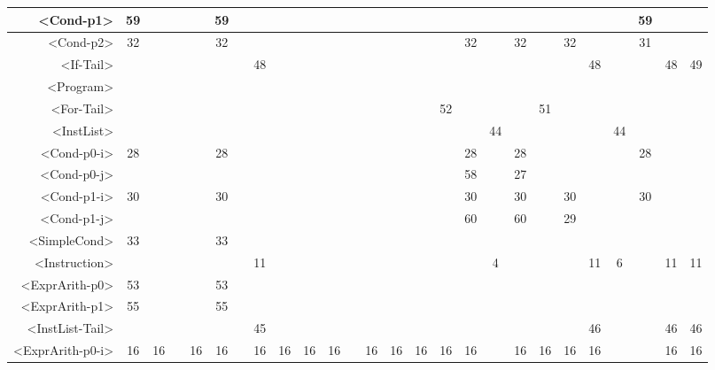 \begin{tabular}{r|c@{ }c@{ }c@{ }c@{ }c@{ }c@{ }c@{ }c@{ }c@{ }c@{ }c@{ }c@{ }c@{ }c@{ }c@{ }c@{ }c@{ }c@{ }c@{ }c@{ }c@{ }c@{ }c@{ }c@{ }c@{ }}
<Cond-p1> & 59 &   &   &   & 59 &   &   &   &   &   &   &   &   &   &   &   &   &   &   &   &   &   & 59 &   &   \\\hline
<Cond-p2> & 32 &   &   &   & 32 &   &   &   &   &   &   &   &   &   &   & 32 &   & 32 &   & 32 &   &   & 31 &   &   \\\hline
<If-Tail> &   &   &   &   &   &   & 48 &   &   &   &   &   &   &   &   &   &   &   &   &   & 48 &   &   & 48 & 49 \\\hline
<Program> &   &   &   &   &   &   &   &   &   &   &   &   &   &   &   &   &   &   &   &   &   &   &   &   &   \\\hline
<For-Tail> &   &   &   &   &   &   &   &   &   &   &   &   &   &   & 52 &   &   &   & 51 &   &   &   &   &   &   \\\hline
<InstList> &   &   &   &   &   &   &   &   &   &   &   &   &   &   &   &   & 44 &   &   &   &   & 44 &   &   &   \\\hline
<Cond-p0-i> & 28 &   &   &   & 28 &   &   &   &   &   &   &   &   &   &   & 28 &   & 28 &   &   &   &   & 28 &   &   \\\hline
<Cond-p0-j> &   &   &   &   &   &   &   &   &   &   &   &   &   &   &   & 58 &   & 27 &   &   &   &   &   &   &   \\\hline
<Cond-p1-i> & 30 &   &   &   & 30 &   &   &   &   &   &   &   &   &   &   & 30 &   & 30 &   & 30 &   &   & 30 &   &   \\\hline
<Cond-p1-j> &   &   &   &   &   &   &   &   &   &   &   &   &   &   &   & 60 &   & 60 &   & 29 &   &   &   &   &   \\\hline
<SimpleCond> & 33 &   &   &   & 33 &   &   &   &   &   &   &   &   &   &   &   &   &   &   &   &   &   &   &   &   \\\hline
<Instruction> &   &   &   &   &   &   & 11 &   &   &   &   &   &   &   &   &   & 4 &   &   &   & 11 & 6 &   & 11 & 11 \\\hline
<ExprArith-p0> & 53 &   &   &   & 53 &   &   &   &   &   &   &   &   &   &   &   &   &   &   &   &   &   &   &   &   \\\hline
<ExprArith-p1> & 55 &   &   &   & 55 &   &   &   &   &   &   &   &   &   &   &   &   &   &   &   &   &   &   &   &   \\\hline
<InstList-Tail> &   &   &   &   &   &   & 45 &   &   &   &   &   &   &   &   &   &   &   &   &   & 46 &   &   & 46 & 46 \\\hline
<ExprArith-p0-i> & 16 & 16 &   & 16 & 16 &   & 16 & 16 & 16 & 16 &   & 16 & 16 & 16 & 16 & 16 &   & 16 & 16 & 16 & 16 &   &   & 16 & 16 \\\hline

\end{tabular}
